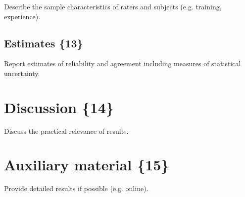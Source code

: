 Describe the sample characteristics of raters and subjects
(e.g. training, experience).

\subsection{Estimates \{13\}}

Report estimates of reliability and agreement including measures of
statistical uncertainty.

\section{Discussion \{14\}}

Discuss the practical relevance of results.

\section{Auxiliary material \{15\}}

Provide detailed results if possible (e.g. online).
